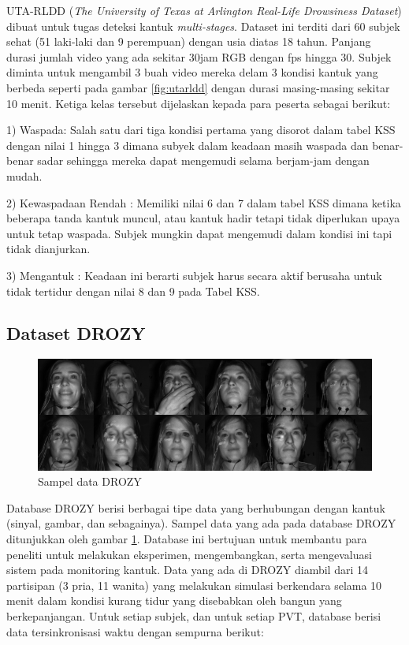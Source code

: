 UTA-RLDD (\emph{The University of Texas at Arlington Real-Life Drowsiness Dataset}) dibuat untuk tugas deteksi kantuk \emph{multi-stages}.
Dataset ini terditi dari 60 subjek sehat (51 laki-laki dan 9 perempuan) dengan usia diatas 18 tahun. Panjang durasi jumlah
video yang ada sekitar 30jam RGB dengan fps hingga 30. Subjek diminta untuk mengambil 3 buah video mereka delam 3 kondisi
kantuk yang berbeda seperti pada gambar \ref{fig:utarldd} dengan durasi masing-masing sekitar 10 menit\parencite{14}. Ketiga kelas tersebut dijelaskan kepada para peserta sebagai
berikut:

1) Waspada: Salah satu dari tiga kondisi pertama yang disorot dalam tabel KSS dengan nilai 1 hingga 3 dimana subyek dalam
keadaan masih waspada dan benar-benar sadar sehingga mereka dapat mengemudi selama berjam-jam dengan mudah.

2) Kewaspadaan Rendah : Memiliki nilai 6 dan 7 dalam tabel KSS dimana ketika beberapa tanda kantuk muncul, atau kantuk
hadir tetapi tidak diperlukan upaya untuk tetap waspada. Subjek mungkin dapat mengemudi dalam kondisi ini tapi tidak dianjurkan.

3) Mengantuk : Keadaan ini berarti subjek harus secara aktif berusaha untuk tidak tertidur dengan nilai 8 dan 9 pada Tabel KSS.

\subsection{Dataset DROZY}

\begin{figure} [ht] \centering
      \includegraphics[scale=0.4]{gambar/DROZY.png}
      \caption{Sampel data DROZY \parencite{29}}
      \label{fig:DROZY}
\end{figure}

Database DROZY berisi berbagai tipe data yang berhubungan dengan kantuk (sinyal, gambar, dan sebagainya). Sampel data yang ada pada
database DROZY ditunjukkan oleh gambar \ref{fig:DROZY}. Database ini
bertujuan untuk membantu para peneliti untuk melakukan eksperimen, mengembangkan, serta mengevaluasi sistem pada monitoring
kantuk. Data yang ada di DROZY diambil dari 14 partisipan (3 pria, 11 wanita) yang melakukan simulasi berkendara selama
10 menit dalam kondisi kurang tidur yang disebabkan oleh bangun yang berkepanjangan. Untuk setiap subjek, dan untuk setiap
PVT, database berisi data tersinkronisasi waktu dengan sempurna berikut:

